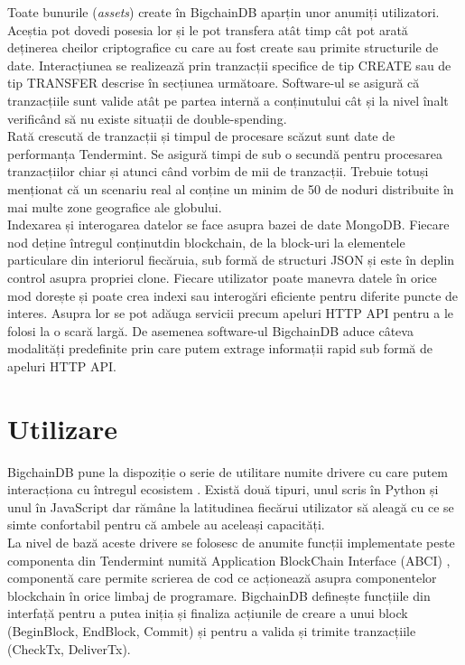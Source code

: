 Toate bunurile (\textit{assets}) create în BigchainDB aparțin unor anumiți utilizatori. Aceștia pot dovedi posesia lor și le pot transfera atât timp cât pot arată deținerea cheilor criptografice cu care au fost create sau primite structurile de date. Interacțiunea se realizează prin tranzacții specifice de tip CREATE sau de tip TRANSFER descrise în secțiunea următoare. Software-ul se asigură că tranzacțiile sunt valide atât pe partea internă a conținutului cât și la nivel înalt verificând să nu existe situații de double-spending.\\

Rată crescută de tranzacții și timpul de procesare scăzut sunt date de performanța Tendermint. Se asigură timpi de sub o secundă pentru procesarea tranzacțiilor chiar și atunci când vorbim de mii de tranzacții. Trebuie totuși menționat că un scenariu real al conține un minim de 50 de noduri distribuite în mai multe zone geografice ale globului.\\

Indexarea și interogarea datelor se face asupra bazei de date MongoDB. Fiecare nod deține întregul conținutdin blockchain, de la block-uri la elementele particulare din interiorul fiecăruia, sub formă de structuri JSON și este în deplin control asupra propriei clone. Fiecare utilizator poate manevra datele în orice mod dorește și poate crea indexi sau interogări eficiente pentru diferite puncte de interes. Asupra lor se pot adăuga servicii precum apeluri HTTP API pentru a le folosi la o scară largă. De asemenea software-ul BigchainDB aduce câteva modalități predefinite prin care putem extrage informații rapid sub formă de apeluri HTTP API.\\

\clearpage

\section{Utilizare}

BigchainDB pune la dispoziție o serie de utilitare numite drivere cu care putem interacționa cu întregul ecosistem \cite{BigchainDB_Docs}. Există două tipuri, unul scris în Python \cite{BigchainDB_PythonDriver} și unul în JavaScript \cite{BigchainDB_JSDriver} dar rămâne la latitudinea fiecărui utilizator să aleagă cu ce se simte confortabil pentru că ambele au aceleași capacități.\\

La nivel de bază aceste drivere se folosesc de anumite funcții implementate peste componenta din Tendermint numită Application BlockChain Interface (ABCI) \cite{Tendermint_WhatIs}, componentă care permite scrierea de cod ce acționează asupra componentelor blockchain în orice limbaj de programare. BigchainDB definește funcțiile din interfață pentru a putea iniția și finaliza acțiunile de creare a unui block (BeginBlock, EndBlock, Commit) și pentru a valida și trimite tranzacțiile (CheckTx, DeliverTx)\cite{BigchainDB_Art}.\\

